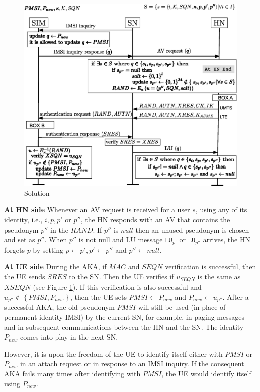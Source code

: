 \documentclass{llncs} %
\begin{document}
\begin{figure}[]
  \centering
    \includegraphics[scale = .38,clip = true, trim = 0cm 0cm 0cm 0cm]{solution.eps}
  \caption{Solution}
  \label{fig:solution}	
\end{figure}

\textbf{At HN side } Whenever an AV request is received for a user $s$, using any of its identity, i.e., $i,p,p'$ or $p''$, the HN responds with an AV that contains the pseudonym $p''$ in the $RAND$. If $p''$ is $null$ then an unused pseudonym is chosen and set as $p''$. When $p''$ is not null and LU message $\texttt{LU}_{p'}$ or $\texttt{LU}_{p''}$ arrives, the HN forgets $p$ by setting $p \leftarrow p', p' \leftarrow p''$ and $p'' \leftarrow null$. 

\textbf{At UE side } During the AKA, if $MAC$ and $SEQN$ verification is successful, then the UE sends $SRES$ to the SN. Then the UE verifies if $u_{SEQN}$ is the same as $XSEQN$ (see Figure \ref{fig:solution}). If this verification is also successful and $u_{p''} \notin \left\lbrace PMSI,P_{new} \right\rbrace$, then the UE sets $PMSI \leftarrow P_{new}$ and $P_{new} \leftarrow u_{p''}$. After a successful AKA, the old pseudonym $PMSI$ will still be used (in place of permanent identity IMSI) by the current SN, for example, in paging messages and in subsequent communications between the HN and the SN. The identity $P_{new}$ comes into play in the next SN. 

However, it is upon the freedom of the UE to identify itself either with $PMSI$ or $P_{new}$ in an attach request or in response to an IMSI inquiry. If the consequent AKA fails many times after identifying with $PMSI$, the UE would identify itself using $P_{new}$.
\end{document}
